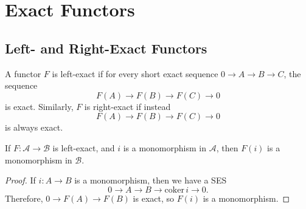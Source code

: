 \section{Exact Functors} %
\label{sec:exact_functors}
\subsection{Left- and Right-Exact Functors} %
\label{sub:left_and_right_exact_functors}
\begin{definition}
   A functor $ F $ is left-exact if for every short exact sequence $ 0 \to A \to B \to C $, the sequence
   \begin{equation*}
   F(A) \to F(B) \to F(C) \to 0
   \end{equation*}
   is exact. Similarly, $ F $ is right-exact if instead
   \begin{equation*}
   F(A)\to F(B) \to F(C) \to 0
   \end{equation*}
   is always exact.
\end{definition}

\begin{lemma}
  If $ F: \mathcal{A} \to \mathcal{B} $ is left-exact, and $ i $ is a monomorphism in $ \mathcal{A} $, then $ F(i) $ is a monomorphism in $ \mathcal{B} $.
\end{lemma}
\begin{proof}
   If $ i: A\to B $ is a monomorphism, then we have a SES
   \begin{equation*}
      0 \to A \to B \to \text{coker}\,i \to 0
   .\end{equation*}
   Therefore, $ 0\to F(A) \to F(B) $ is exact, so $ F(i) $ is a monomorphism.
\end{proof}

